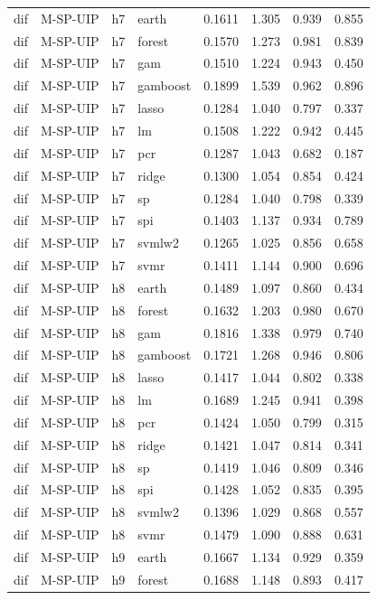 \begin{ThreePartTable}
\begin{longtable}[t]{llclcccc}
dif & M-SP-UIP & h7 & earth & 0.1611 & 1.305 & 0.939 & 0.855\\
dif & M-SP-UIP & h7 & forest & 0.1570 & 1.273 & 0.981 & 0.839\\
dif & M-SP-UIP & h7 & gam & 0.1510 & 1.224 & 0.943 & 0.450\\
dif & M-SP-UIP & h7 & gamboost & 0.1899 & 1.539 & 0.962 & 0.896\\
dif & M-SP-UIP & h7 & lasso & 0.1284 & 1.040 & 0.797 & 0.337\\
dif & M-SP-UIP & h7 & lm & 0.1508 & 1.222 & 0.942 & 0.445\\
dif & M-SP-UIP & h7 & pcr & 0.1287 & 1.043 & 0.682 & 0.187\\
dif & M-SP-UIP & h7 & ridge & 0.1300 & 1.054 & 0.854 & 0.424\\
dif & M-SP-UIP & h7 & sp & 0.1284 & 1.040 & 0.798 & 0.339\\
dif & M-SP-UIP & h7 & spi & 0.1403 & 1.137 & 0.934 & 0.789\\
dif & M-SP-UIP & h7 & svmlw2 & 0.1265 & 1.025 & 0.856 & 0.658\\
dif & M-SP-UIP & h7 & svmr & 0.1411 & 1.144 & 0.900 & 0.696\\
\addlinespace
dif & M-SP-UIP & h8 & earth & 0.1489 & 1.097 & 0.860 & 0.434\\
dif & M-SP-UIP & h8 & forest & 0.1632 & 1.203 & 0.980 & 0.670\\
dif & M-SP-UIP & h8 & gam & 0.1816 & 1.338 & 0.979 & 0.740\\
dif & M-SP-UIP & h8 & gamboost & 0.1721 & 1.268 & 0.946 & 0.806\\
dif & M-SP-UIP & h8 & lasso & 0.1417 & 1.044 & 0.802 & 0.338\\
dif & M-SP-UIP & h8 & lm & 0.1689 & 1.245 & 0.941 & 0.398\\
dif & M-SP-UIP & h8 & pcr & 0.1424 & 1.050 & 0.799 & 0.315\\
dif & M-SP-UIP & h8 & ridge & 0.1421 & 1.047 & 0.814 & 0.341\\
dif & M-SP-UIP & h8 & sp & 0.1419 & 1.046 & 0.809 & 0.346\\
dif & M-SP-UIP & h8 & spi & 0.1428 & 1.052 & 0.835 & 0.395\\
dif & M-SP-UIP & h8 & svmlw2 & 0.1396 & 1.029 & 0.868 & 0.557\\
dif & M-SP-UIP & h8 & svmr & 0.1479 & 1.090 & 0.888 & 0.631\\
\addlinespace
dif & M-SP-UIP & h9 & earth & 0.1667 & 1.134 & 0.929 & 0.359\\
dif & M-SP-UIP & h9 & forest & 0.1688 & 1.148 & 0.893 & 0.417\\

\end{longtable}
\end{ThreePartTable}
